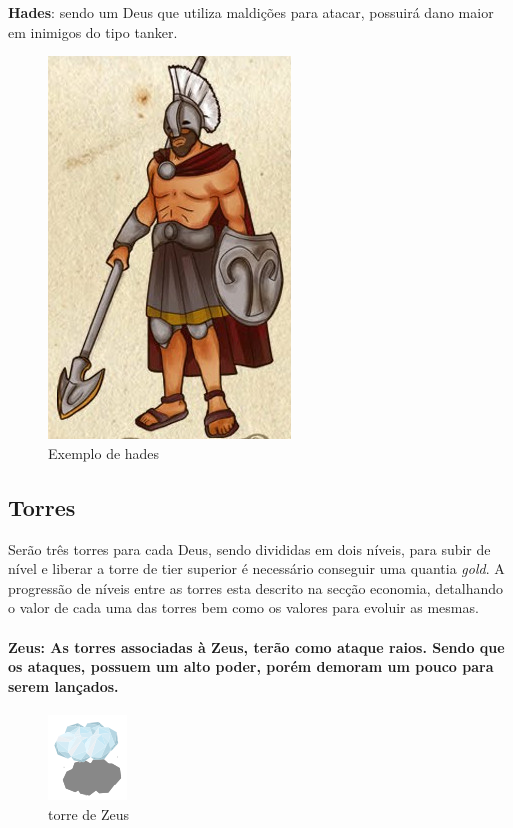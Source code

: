 \documentclass[11pt]{article} %
\begin{document}
{\large \textbf{Hades}}: sendo um Deus que utiliza maldições para atacar, possuirá dano maior em inimigos do tipo tanker.
\begin{figure}[!htp]
\centering
\includegraphics[scale=0.25]{res/characters/hades.png}
\caption{Exemplo de hades}
\label{satiro}
\end{figure}

\subsection{Torres}
Serão três torres para cada Deus, sendo divididas em dois níveis, para subir de nível e liberar a torre de tier superior é necessário conseguir uma quantia \textit{gold}. A progressão de níveis entre as torres esta descrito na secção economia, detalhando o valor de cada uma das torres bem como os valores para evoluir as mesmas.

\paragraph{{\Large Zeus}: As torres associadas à Zeus, terão como ataque raios. Sendo que os ataques, possuem um alto poder, porém demoram um pouco para serem lançados.}

\begin{figure}[!htp]
\centering
\includegraphics[scale=1.3]{res/characters/zeus_tower.png}
\caption{torre de Zeus}
\label{satiro}
\end{figure}
\end{document}
